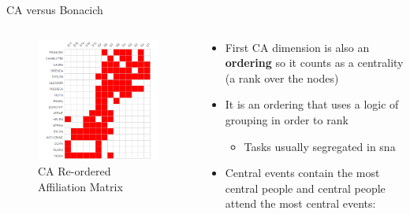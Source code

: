 \documentclass[
  ignorenonframetext,
]{beamer}
\providecommand{\tightlist}{%
  \setlength{\itemsep}{0pt}\setlength{\parskip}{0pt}}\usepackage{longtable,booktabs,array}
\begin{document}
\begin{frame}{CA versus Bonacich}
\protect\hypertarget{ca-versus-bonacich-7}{}
\begin{columns}[T]
\begin{column}{0.5\textwidth}
\begin{figure}

{\centering \includegraphics{Plots/ca-reord.png}

}

\caption{CA Re-ordered Affiliation Matrix}

\end{figure}
\end{column}

\begin{column}{0.5\textwidth}
\begin{itemize}
\tightlist
\item
  First CA dimension is also an \textbf{ordering} so it counts as a
  centrality (a rank over the nodes)
\item
  It is an ordering that uses a logic of grouping in order to rank

  \begin{itemize}
  \tightlist
  \item
    Tasks usually segregated in sna
  \end{itemize}
\item
  Central events contain the most central people and central people
  attend the most central events:


\end{itemize}
\end{column}
\end{columns}
\end{frame}
\end{document}
